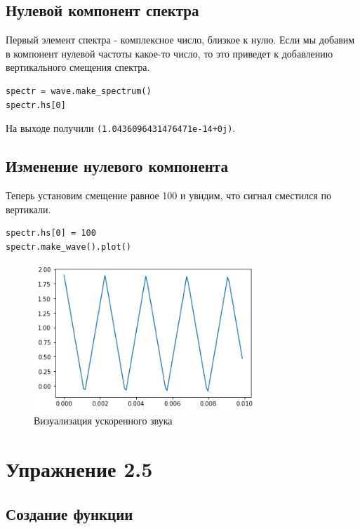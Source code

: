 \documentclass[a4paper,12pt]{report}
\begin{document}
\section{Нулевой компонент спектра}

Первый элемент спектра - комплексное число, близкое к нулю. Если мы добавим в компонент нулевой частоты какое-то число, то это приведет к добавлению вертикального смещения спектра.

\begin{lstlisting}[caption=Вывод нулевого компонента]
spectr = wave.make_spectrum()
spectr.hs[0]
\end{lstlisting}

На выходе получили \texttt{(1.0436096431476471e-14+0j)}.

\section{Изменение нулевого компонента}

Теперь установим смещение равное 100 и увидим, что сигнал сместился по вертикали.

\begin{lstlisting}[caption=Смещение спектра и его визуализация]
spectr.hs[0] = 100
spectr.make_wave().plot()
\end{lstlisting}

\begin{figure}[H]
        \centering
        \includegraphics[width=0.75\textwidth]{5.png}
        \caption{Визуализация ускоренного звука}
        \label{fig:fig4_2}
\end{figure}

\chapter{Упражнение 2.5}
\section{Создание функции}
\end{document}
